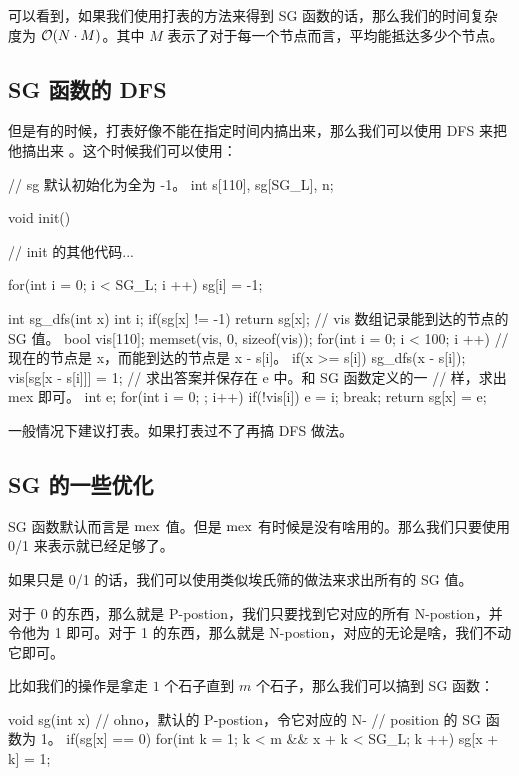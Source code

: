 可以看到，如果我们使用打表的方法来得到 SG 函数的话，那么我们的时间复杂度为 $
\mathcal{O}(N \cdot M)$。其中 $M$ 表示了对于每一个节点而言，平均能抵达多少个节点。

\subsection{SG 函数的 DFS}\label{sec:SG 函数的 DFS}

但是有的时候，打表好像不能在指定时间内搞出来，那么我们可以使用 DFS 来把他搞出来
。这个时候我们可以使用：
\begin{Cpp}
// sg 默认初始化为全为 -1。
int s[110], sg[SG_L], n;

void init() {
    // init 的其他代码...

    for(int i = 0; i < SG_L; i ++)
        sg[i] = -1;
}

int sg_dfs(int x) {
    int i;
    if(sg[x] != -1)
        return sg[x];
    // vis 数组记录能到达的节点的 SG 值。
    bool vis[110];
    memset(vis, 0, sizeof(vis));
    for(int i = 0; i < 100; i ++) {
        // 现在的节点是 x，而能到达的节点是 x - s[i]。
        if(x >= s[i]) {
            sg_dfs(x - s[i]);
            vis[sg[x - s[i]]] = 1;
        }
    }
    // 求出答案并保存在 e 中。和 SG 函数定义的一
    // 样，求出 mex 即可。
    int e;
    for(int i = 0; ; i++) {
        if(!vis[i]) {
            e = i;
            break;
        }
    }
    return sg[x] = e;
}
\end{Cpp}

一般情况下建议打表。如果打表过不了再搞 DFS 做法。

\subsection{SG 的一些优化}
SG 函数默认而言是 $\mathrm{mex}$ 值。但是 $\mathrm{mex}$ 有时候是没有啥用的。那么我们只要使用
0/1 来表示就已经足够了。

如果只是 0/1 的话，我们可以使用类似埃氏筛的做法来求出所有的 SG 值。

对于 0 的东西，那么就是 P-postion，我们只要找到它对应的所有 N-postion，并令他为
1 即可。对于 1 的东西，那么就是 N-postion，对应的无论是啥，我们不动它即可。

比如我们的操作是拿走 $1$ 个石子直到 $m$ 个石子，那么我们可以搞到 SG 函数：

\begin{Cpp}
void sg(int x) {
    // ohno，默认的 P-postion，令它对应的 N-
    // position 的 SG 函数为 1。
    if(sg[x] == 0) {
        for(int k = 1; k < m && x + k < SG_L;
            k ++) {
            sg[x + k] = 1;
        }
    }
}
\end{Cpp}
